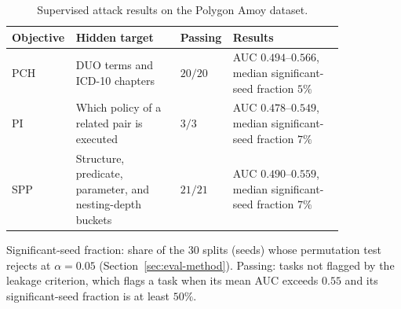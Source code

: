 \begin{table}[htbp]
	\centering
	\caption{Supervised attack results on the Polygon Amoy dataset.}
	\label{tab:privacy-summary}
	\begin{tabular}{p{0.11\linewidth}>{\raggedright\arraybackslash}p{0.31\linewidth}p{0.09\linewidth}>{\raggedright\arraybackslash}p{0.33\linewidth}}
		\toprule
		Objective & Hidden target                                              & Passing                                                      & Results                 \\
		\midrule
		PCH       & DUO terms and ICD-10 chapters
		          & $20/20$                                                    & AUC $0.494$--$0.566$, median significant-seed fraction $5\%$                           \\
		PI        & Which policy of a related pair is executed
		          & $3/3$                                                      & AUC $0.478$--$0.549$, median significant-seed fraction $7\%$                           \\
		SPP       & Structure, predicate, parameter, and nesting-depth buckets
		          & $21/21$                                                    & AUC $0.490$--$0.559$, median significant-seed fraction $7\%$                           \\
		\bottomrule
	\end{tabular}

	\begin{tablenote}
		Significant-seed fraction: share of the $30$ splits (seeds) whose permutation test rejects at $\alpha=0.05$ (Section~\ref{sec:eval-method}).
		Passing: tasks not flagged by the leakage criterion, which flags a task when its mean AUC exceeds $0.55$ and its significant-seed fraction is at least $50\%$.
	\end{tablenote}
\end{table}

